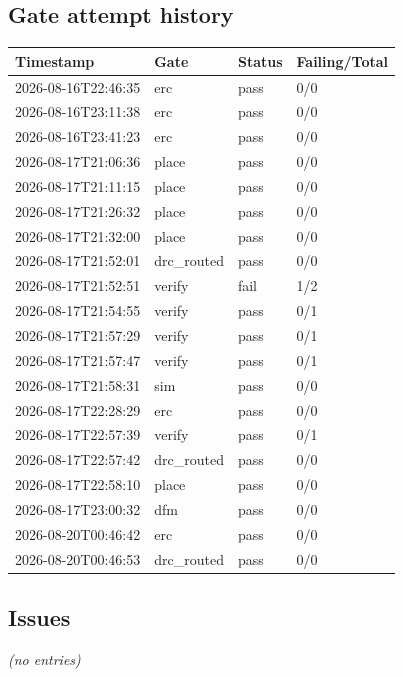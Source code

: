 \documentclass[11pt,a4paper]{article}
\begin{document}
\subsection*{Gate attempt history}
{\small
\begin{longtable}{llll}
\toprule
\textbf{Timestamp} & \textbf{Gate} & \textbf{Status} & \textbf{Failing/Total} \\
\midrule
\endhead
2026-08-16T22:46:35 & erc & pass & 0/0 \\
2026-08-16T23:11:38 & erc & pass & 0/0 \\
2026-08-16T23:41:23 & erc & pass & 0/0 \\
2026-08-17T21:06:36 & place & pass & 0/0 \\
2026-08-17T21:11:15 & place & pass & 0/0 \\
2026-08-17T21:26:32 & place & pass & 0/0 \\
2026-08-17T21:32:00 & place & pass & 0/0 \\
2026-08-17T21:52:01 & drc\_routed & pass & 0/0 \\
2026-08-17T21:52:51 & verify & fail & 1/2 \\
2026-08-17T21:54:55 & verify & pass & 0/1 \\
2026-08-17T21:57:29 & verify & pass & 0/1 \\
2026-08-17T21:57:47 & verify & pass & 0/1 \\
2026-08-17T21:58:31 & sim & pass & 0/0 \\
2026-08-17T22:28:29 & erc & pass & 0/0 \\
2026-08-17T22:57:39 & verify & pass & 0/1 \\
2026-08-17T22:57:42 & drc\_routed & pass & 0/0 \\
2026-08-17T22:58:10 & place & pass & 0/0 \\
2026-08-17T23:00:32 & dfm & pass & 0/0 \\
2026-08-20T00:46:42 & erc & pass & 0/0 \\
2026-08-20T00:46:53 & drc\_routed & pass & 0/0 \\
\bottomrule
\end{longtable}
}
\subsection*{Issues}
\emph{(no entries)}
\end{document}
